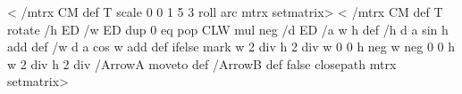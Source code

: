 \def\pscirclebox@iv{%
\pst@number{\wd\pst@hbox}2 div
\pst@number{\ht\pst@hbox}\pst@number{\dp\pst@hbox}add 2 div
2 copy \pst@number{\dp\pst@hbox}sub 4 2 roll
\tx@Pyth \pst@number\psframesep add }
\def\pscirclebox@sep{%
\pst@dimb=\ht\pst@hbox
\advance\pst@dimb\dp\pst@hbox
\divide\pst@dimb 2
\pst@dima=.5\wd\pst@hbox
\pst@pyth\pst@dima\pst@dimb\pst@dimc
\advance\pst@dimc\pslinewidth
\advance\pst@dimc\psframesep
\advance\pst@dimb-\pst@dimc
\setbox\pst@hbox=\hbox to2\pst@dimc{%
\hss
\vbox{\kern-\pst@dimb\box\pst@hbox}%
\hss}%
\advance\pst@dimb-\dp\pst@hbox
\dp\pst@hbox=-\pst@dimb}
<%
/mtrx CM def
T
scale
0 0 1 5 3 roll arc
mtrx setmatrix>
\def\psellipse{\def\pst@par{}\pst@object{psellipse}}
\def\psellipse@i(#1){\@ifnextchar(%
{\psellipse@ii(#1)}{\psellipse@ii(0,0)(#1)}}
\def\psellipse@ii(#1)(#2){%
\begin@ClosedObj
\pst@getcoor{#1}\pst@tempa
\pst@@getcoor{#2}%
\addto@pscode{%
0 360
\pst@coor
\ifdim\psk@dimen\p@=\z@\else
\psk@dimen CLW mul
dup 4 -1 roll sub neg 3 1 roll sub
\fi
\pst@tempa
\tx@Ellipse
closepath}%
\def\pst@linetype{2}%
\end@ClosedObj}
\def\psovalbox{\def\pst@par{}\pst@object{psovalbox}}
\def\psovalbox@i{\pst@makebox{\psovalbox@ii}}
\def\psovalbox@ii{%
\begingroup
\pst@useboxpar
\psovalbox@iii
\ifpsboxsep\psovalbox@sep\fi
\leavevmode
\box\pst@hbox
\endgroup}
\def\psovalbox@iii{%
\psovalbox@iv
\setbox\pst@hbox=\hbox{%
\begin@ClosedObj
\addto@pscode{%
0 360
\pst@number\pst@dimc CLW 2 div sub
\pst@number\pst@dimd CLW 2 div sub
\pst@number\pst@dima
\pst@number\pst@dimb
\tx@Ellipse
closepath}%
\def\pst@linetype{2}%
\end@ClosedObj
\unhbox\pst@hbox}}
\def\psovalbox@iv{%
\pst@dimc=\pslinewidth\advance\pst@dimc\psframesep
\pst@dimd=\ht\pst@hbox\advance\pst@dimd\dp\pst@hbox
\pst@dima=.5\wd\pst@hbox
\pst@dimb=.5\pst@dimd\advance\pst@dimb-\dp\pst@hbox
\pst@dimd=.707\pst@dimd
\advance\pst@dimd\pst@dimc
\advance\pst@dimc.707\wd\pst@hbox}
\def\psovalbox@sep{%
\setbox\pst@hbox\hbox to 2\pst@dimc{\hss\unhbox\pst@hbox\hss}%
\pst@dimg=\pst@dimd
\advance\pst@dimg-\pst@dimb
\dp\pst@hbox=\pst@dimg
\advance\pst@dimd\pst@dimb
\ht\pst@hbox=\pst@dimd}
\def\psset@gangle#1{\pst@getangle{#1}\psk@gangle}
\psset@gangle{0}
<%
/mtrx CM def
T
rotate
/h ED
/w ED
dup 0 eq
{ pop }
{ CLW mul neg /d ED
/a w h \tx@Atan def
/h d a sin \tx@Div h add def
/w d a cos \tx@Div w add def }
ifelse
mark
w 2 div h 2 div
w 0
0 h neg
w neg 0
0 h
w 2 div h 2 div
/ArrowA { moveto } def
/ArrowB { } def
false \tx@Line
closepath
mtrx setmatrix>
\def\psdiamond{\def\pst@par{}\pst@object{psdiamond}}
\def\psdiamond@i(#1){%
\@ifnextchar({\psdiamond@ii(#1)}{\psdiamond@ii(0,0)(#1)}}
